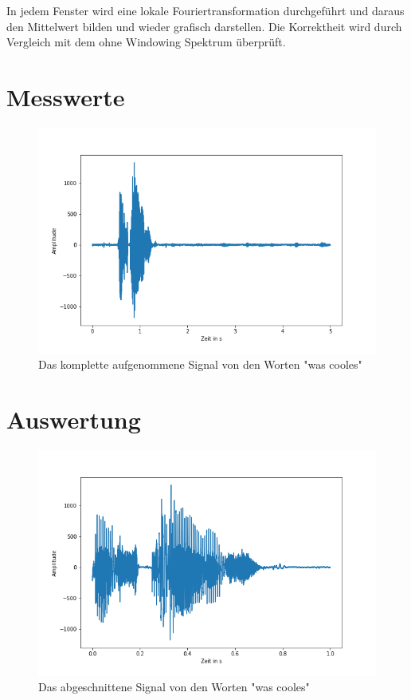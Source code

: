 \documentclass[12pt, oneside, a4paper, \docLanguage]{report}
\begin{document}
In jedem Fenster wird eine lokale Fouriertransformation durchgeführt und daraus den Mittelwert bilden und wieder grafisch darstellen. Die Korrektheit wird durch Vergleich mit dem ohne Windowing Spektrum überprüft.


\section{Messwerte}
\label{chap:VERSUCH_1_MESSWERTE}
\begin{figure}[H]
	\centering\small
	\includegraphics[width=12cm]{v1.png}
	\caption{Das komplette aufgenommene Signal von den Worten "was cooles"}
\end{figure}
\section{Auswertung}
\label{chap:VERSUCH_1_AUSWERTUNG}
\begin{figure}[H]
	\centering\small
	\includegraphics[width=12cm]{v1_abgeschnitten.png}
	\caption{Das abgeschnittene Signal von den Worten "was cooles"}
\end{figure}
\end{document}
